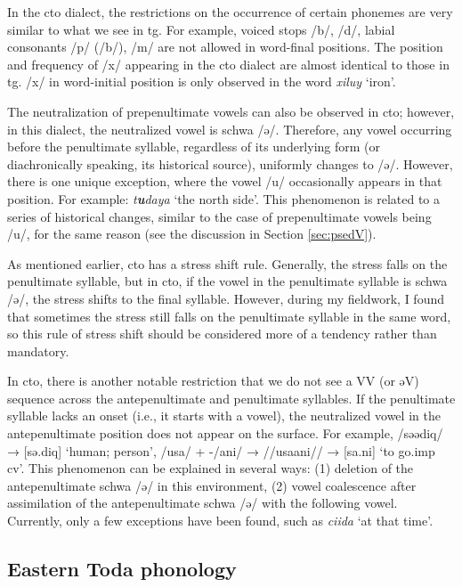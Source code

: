 In the \acl{cto} dialect, the restrictions on the occurrence of certain phonemes are very similar to what we see in \acl{tg}. For example, voiced stops /b/, /d/, labial consonants /p/ (/b/), /m/ are not allowed in word-final positions. The position and frequency of /x/ appearing in the \acl{cto} dialect are almost identical to those in \acl{tg}. /x/ in word-initial position is only observed in the word \textit{xiluy} `iron'.

The neutralization of prepenultimate vowels can also be observed in \acl{cto}; however, in this dialect, the neutralized vowel is schwa /ə/. Therefore, any vowel occurring before the penultimate syllable, regardless of its underlying form (or diachronically speaking, its historical source), uniformly changes to /ə/. However, there is one unique exception, where the vowel /u/ occasionally appears in that position. For example: \textit{t\textbf{u}daya} `the north side'. This phenomenon is related to a series of historical changes, similar to the case of prepenultimate vowels being /u/, for the same reason (see the discussion in Section \ref{sec:psedV}).

As mentioned earlier, \acl{cto} has a stress shift rule. Generally, the stress falls on the penultimate syllable, but in \acl{cto}, if the vowel in the penultimate syllable is schwa /ə/, the stress shifts to the final syllable. However, during my fieldwork, I found that sometimes the stress still falls on the penultimate syllable in the same word, so this rule of stress shift should be considered more of a tendency rather than mandatory.

In \acl{cto}, there is another notable restriction that we do not see a VV (or əV) sequence across the antepenultimate and penultimate syllables. If the penultimate syllable lacks an onset (i.e., it starts with a vowel), the neutralized vowel in the antepenultimate position does not appear on the surface. For example, /səədiq/ → [sə.diq] `human; person', /usa/ + -/ani/ → //usaani// → [sa.ni] `to go.\acs{imp} \acs{cv}'. This phenomenon can be explained in several ways: (1) deletion of the antepenultimate schwa /ə/ in this environment, (2) vowel coalescence after assimilation of the antepenultimate schwa /ə/ with the following vowel. Currently, only a few exceptions have been found, such as \textit{ciida} `at that time'.

\subsection{Eastern Toda phonology}

